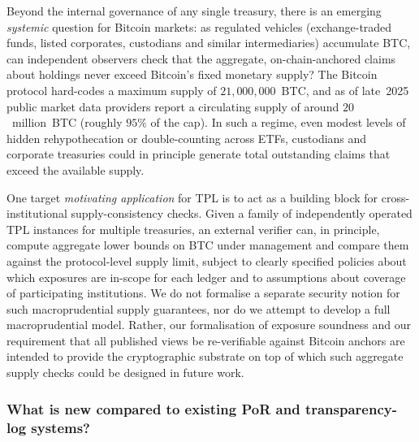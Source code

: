 \documentclass[11pt]{article}
\begin{document}
Beyond the internal governance of any single treasury, there is an emerging \emph{systemic} question for
Bitcoin markets: as regulated vehicles (exchange-traded funds, listed corporates, custodians and similar
intermediaries) accumulate BTC, can independent observers check that the aggregate, on-chain-anchored claims
about holdings never exceed Bitcoin's fixed monetary supply?
The Bitcoin protocol hard-codes a maximum supply of $21{,}000{,}000$~BTC, and as of late~2025
public market data providers report a circulating supply of around $20$~million~BTC
(roughly $95\%$ of the cap).
In such a regime, even modest levels of hidden rehypothecation or double-counting across ETFs, custodians and
corporate treasuries could in principle generate total outstanding claims that exceed the available supply.

One target \emph{motivating application} for TPL is to act as a building block for cross-institutional
supply-consistency checks.
Given a family of independently operated TPL instances for multiple treasuries, an external verifier can,
in principle, compute aggregate lower bounds on BTC under management and compare them against the
protocol-level supply limit, subject to clearly specified policies about which exposures are in-scope
for each ledger and to assumptions about coverage of participating institutions.
We do not formalise a separate security notion for such macroprudential supply guarantees,
nor do we attempt to develop a full macroprudential model.
Rather, our formalisation of exposure soundness and our requirement that all published views be
re-verifiable against Bitcoin anchors are intended to provide the cryptographic substrate on top of
which such aggregate supply checks could be designed in future work.
\subsubsection*{What is new compared to existing PoR and transparency-log systems?}
\end{document}

